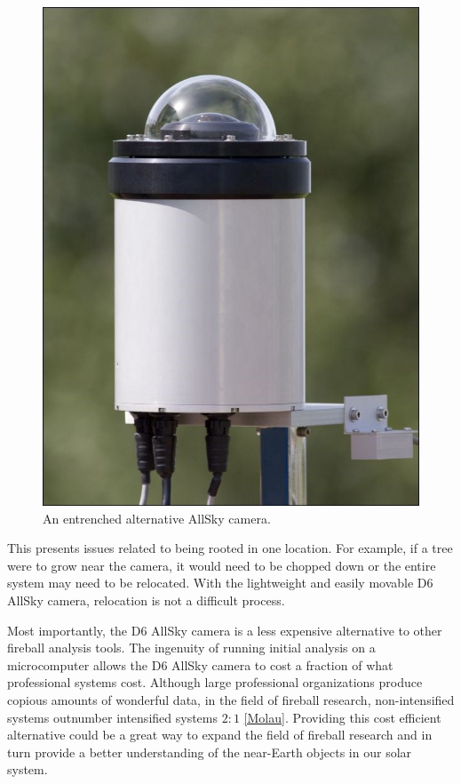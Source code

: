 \begin{figure}[ht!]
  \centering
  \includegraphics[scale=0.3]{images/othercam.jpg}
  \caption{An entrenched alternative AllSky camera.}
  \label{immobile}
\end{figure}

This presents issues related to being rooted in one location.
For example, if a tree were to grow near the camera, it would need to be chopped down or the entire system may need to be relocated.
With the lightweight and easily movable D6 AllSky camera, relocation is not a difficult process.

Most importantly, the D6 AllSky camera is a less expensive alternative to other fireball analysis tools.  
The ingenuity of running initial analysis on a microcomputer allows the D6 AllSky camera to cost a fraction of what professional systems cost.
Although large professional organizations produce copious amounts of wonderful data, in the field of fireball research, non-intensified systems outnumber intensified systems $2:1$ \ref{Molau}.  
Providing this cost efficient alternative could be a great way to expand the field of fireball research and in turn provide a better understanding of the near-Earth objects in our solar system.






